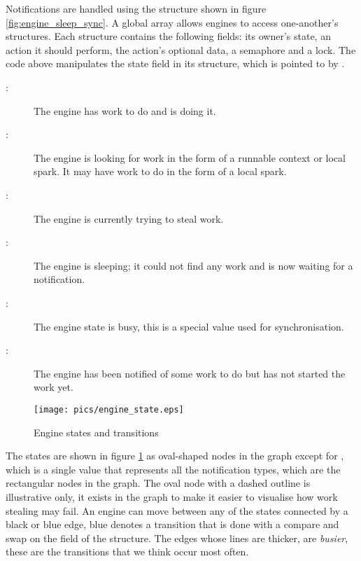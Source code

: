 Notifications are handled using the \enginesleepsync structure shown in
figure \ref{fig:engine_sleep_sync}.
A global array allows engines to access one-another's \enginesleepsync
structures.
Each structure contains the following fields:
its owner's state,
an action it should perform,
the action's optional data,
a semaphore and a lock.
The \idle code above manipulates the state field in its structure,
which is pointed to by .

\begin{description}
    \item[:] The engine has work to do and is doing it.

    \item[:] The engine is looking for work in
        the form of a runnable context or local spark.  It may have work to
        do in the form of a local spark.

    \item[:] The engine is currently trying to steal work.

    \item[:] The engine is sleeping; it could not find any
        work and is now waiting for a notification.

    \item[:] The engine state is busy, this is a special value
        used for synchronisation.

    \item[:] The engine has been notified of some work to
        do but has not started the work yet.
\end{description}

\begin{figure}
\begin{center}
\texttt{[image: pics/engine\_state.eps]}
\end{center}
\caption{Engine states and transitions}
\label{fig:engine_states}
\end{figure}

\noindent
{}
The states are shown in figure \ref{fig:engine_states} as oval-shaped nodes
in the graph except for ,
which is a single value that represents all the notification types,
which are the rectangular nodes in the graph.
The oval node with a dashed outline is illustrative only,
it exists in the graph to make it easier to visualise how work stealing may
fail.
An engine can move between any of the states connected by a black or blue
edge,
blue denotes a transition that is done with a compare and swap on the
 field of the \enginesleepsync structure.
The edges whose lines are thicker, are \emph{busier},
these are the transitions that we think occur most often.


